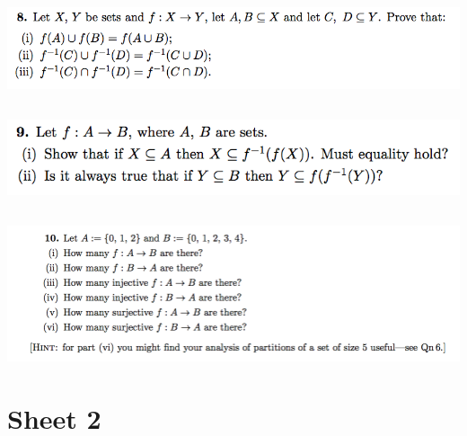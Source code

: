\documentclass[12pt]{article}
\begin{document}
\newpage
\subsection*{} %
\includegraphics[width=400pt]{img/iulm-1-8.png}
\begin{mdframed}
\end{mdframed}

\newpage
\subsection*{} %
\includegraphics[width=400pt]{img/iulm-1-9.png}
\begin{mdframed}
\end{mdframed}

\newpage
\subsection*{} %
\includegraphics[width=400pt]{img/iulm-1-10.png}
\begin{mdframed}
\end{mdframed}

\newpage
\section{Sheet 2}
\end{document}
